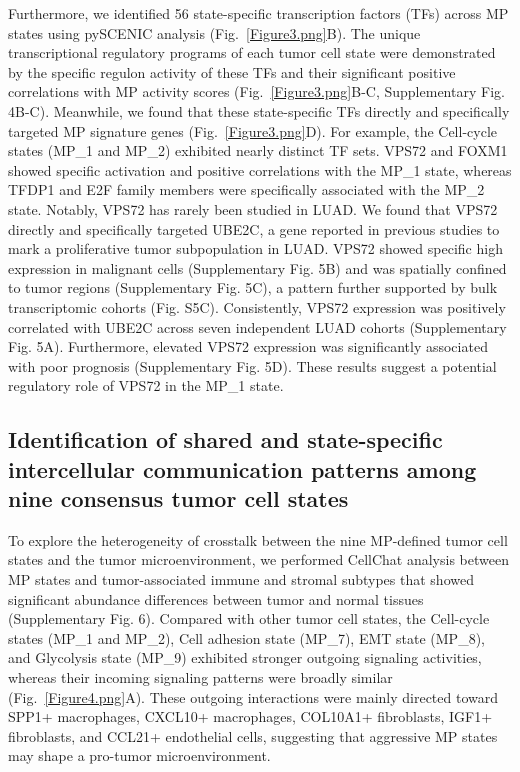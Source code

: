 \documentclass[pdflatex,sn-mathphys-num]{sn-jnl}%
\theoremstyle{thmstyleone}%
\theoremstyle{thmstyletwo}%
\theoremstyle{thmstylethree}%
\begin{document}
Furthermore, we identified 56 state-specific transcription factors (TFs) across MP states using pySCENIC analysis (Fig.~\ref{Figure3.png}B). The unique transcriptional regulatory programs of each tumor cell state were demonstrated by the specific regulon activity of these TFs and their significant positive correlations with MP activity scores (Fig.~\ref{Figure3.png}B-C, Supplementary Fig. 4B-C). Meanwhile, we found that these state-specific TFs directly and specifically targeted MP signature genes (Fig.~\ref{Figure3.png}D). For example, the Cell-cycle states (MP\_1 and MP\_2) exhibited nearly distinct TF sets. VPS72 and FOXM1 showed specific activation and positive correlations with the MP\_1 state, whereas TFDP1 and E2F family members were specifically associated with the MP\_2 state.
Notably, VPS72 has rarely been studied in LUAD. We found that VPS72 directly and specifically targeted UBE2C, a gene reported in previous studies to mark a proliferative tumor subpopulation in LUAD. VPS72 showed specific high expression in malignant cells (Supplementary Fig. 5B) and was spatially confined to tumor regions (Supplementary Fig. 5C), a pattern further supported by bulk transcriptomic cohorts (Fig. S5C). Consistently, VPS72 expression was positively correlated with UBE2C across seven independent LUAD cohorts (Supplementary Fig. 5A). Furthermore, elevated VPS72 expression was significantly associated with poor prognosis (Supplementary Fig. 5D). These results suggest a potential regulatory role of VPS72 in the MP\_1 state.

\subsection{Identification of shared and state-specific intercellular communication patterns among nine consensus tumor cell states}\label{subsec4}

To explore the heterogeneity of crosstalk between the nine MP-defined tumor cell states and the tumor microenvironment, we performed CellChat analysis between MP states and tumor-associated immune and stromal subtypes that showed significant abundance differences between tumor and normal tissues (Supplementary Fig. 6). Compared with other tumor cell states, the Cell-cycle states (MP\_1 and MP\_2), Cell adhesion state (MP\_7), EMT state (MP\_8), and Glycolysis state (MP\_9) exhibited stronger outgoing signaling activities, whereas their incoming signaling patterns were broadly similar (Fig.~\ref{Figure4.png}A). These outgoing interactions were mainly directed toward SPP1+ macrophages, CXCL10+ macrophages, COL10A1+ fibroblasts, IGF1+ fibroblasts, and CCL21+ endothelial cells, suggesting that aggressive MP states may shape a pro-tumor microenvironment.
\end{document}
